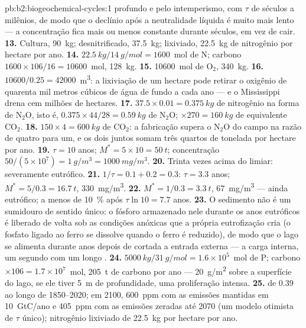 \begin{solution}{pb:b2:biogeochemical-cycles:1}
profundo e pelo intemperismo, com $\tau$ de séculos a milênios, de modo
que o declínio após a neutralidade líquida é muito mais lento --- a
concentração fica mais ou menos constante durante séculos, em vez de
cair.
\textbf{13.} Cultura, \qty{90}{kg}; desnitrificado, \qty{37.5}{kg};
lixiviado, \qty{22.5}{kg} de nitrogênio por hectare por ano.
\textbf{14.} $\qty{22.5}{kg}/\qty{14}{g/mol} = 1600$~mol de N; carbono
$1600\times 106/16 = \num{10600}$~mol, \qty{128}{kg}.
\textbf{15.} \num{10600}~mol de $\mathrm{O_2}$, \qty{340}{kg}.
\textbf{16.} $\num{10600}/0.25 = \num{42000}$~\unit{m^3}: a lixiviação
de um hectare pode retirar o oxigênio de quarenta mil metros cúbicos de
água de fundo a cada ano --- e o Mississippi drena cem milhões de
hectares.
\textbf{17.} $37.5\times 0.01 = \qty{0.375}{kg}$ de nitrogênio na forma de
$\mathrm{N_2O}$, isto é, $0.375\times 44/28 = \qty{0.59}{kg}$ de $\mathrm{N_2O}$;
$\times 270 = \qty{160}{kg}$ de equivalente $\mathrm{CO_2}$.
\textbf{18.} $150\times 4 = \qty{600}{kg}$ de $\mathrm{CO_2}$: a fabricação
supera o $\mathrm{N_2O}$ do campo na razão de quatro para um, e os dois
juntos somam três quartos de tonelada por hectare por ano.
\textbf{19.} $\tau = 10$ anos; $M^{*} = 5\times 10 = \qty{50}{t}$;
concentração $50/(5\times 10^{7}) = \qty{1}{g/m^3} =
\qty{1000}{mg/m^3}$.
\textbf{20.} Trinta vezes acima do limiar: severamente eutrófico.
\textbf{21.} $1/\tau = 0.1 + 0.2 = 0.3$: $\tau = 3.3$ anos; $M^{*} =
5/0.3 = \qty{16.7}{t}$, \qty{330}{mg/m^3}.
\textbf{22.} $M^{*} = 1/0.3 = \qty{3.3}{t}$, \qty{67}{mg/m^3} --- ainda
eutrófico; a menos de \qty{10}{\%} após $\tau\ln 10 = 7.7$ anos.
\textbf{23.} O sedimento não é um sumidouro de sentido único: o fósforo
armazenado nele durante os anos eutróficos é liberado de volta sob as
condições anóxicas que a própria eutrofização cria (o fosfato ligado ao
ferro se dissolve quando o ferro é reduzido), de modo que o lago se
alimenta durante anos depois de cortada a entrada externa --- a carga
interna, um segundo  com um longo .
\textbf{24.} $\qty{5000}{kg}/\qty{31}{g/mol} = 1.6\times 10^{5}$~mol de P;
carbono $\times 106 = 1.7\times 10^{7}$~mol, \qty{205}{t} de carbono por
ano --- \qty{20}{g/m^2} sobre a superfície do lago, se ele tiver
\qty{5}{m} de profundidade, uma proliferação intensa.
\textbf{25.}  de $0.39$ ao longo de 1850--2020; em 2100,
\qty{600}{ppm} com as emissões mantidas em \qty{10}{GtC/ano} e
\qty{405}{ppm} com as emissões zeradas até 2070 (um modelo otimista de
$\tau$ único); nitrogênio lixiviado de \qty{22.5}{kg} por hectare
por ano.
\end{solution}
